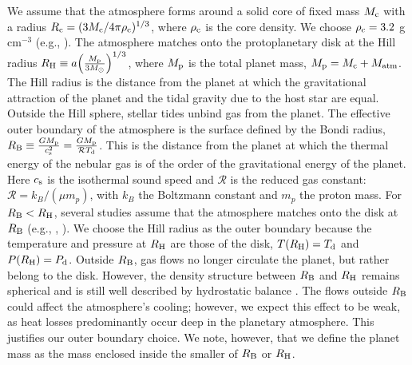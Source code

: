 \documentclass[apj]{emulateapj}
\newcommand{\co}{_{\rm c}}
\newcommand{\di}{_{\rm d}}
\begin{document}
We assume that the atmosphere forms around a solid core of fixed mass $M_{\rm c}$ with a radius $R_{\rm c}=(3 M_{\rm c}/4 \pi \rho_{\rm c})^{1/3}$, where $\rho_{\rm c}$ is the core density. We choose $\rho_{\rm c}=3.2$ g cm$^{-3}$ (e.g., \citealt{pap99}). The atmosphere matches onto the protoplanetary disk at the Hill radius $R_{\rm H} \equiv a \Big(\frac{M_{\rm p}}{3 M_{\odot}}\Big)^{1/3}$, where $M_{\rm p}$ is the total planet mass, $M_{\rm p}=M\co+M_{\rm atm}$. The Hill radius is the distance from the planet at which the gravitational attraction of the planet and the tidal gravity due to the host star are equal. Outside the Hill sphere, stellar tides unbind gas from the planet. The effective outer boundary of the atmosphere is the surface defined by the Bondi radius, $R_{\rm B} \equiv \frac{G M_{\rm p}}{c_{\rm s}^2}=\frac{G M_{\rm p}}{\mathcal{R} T\di}$. This is the distance from the planet at which the thermal energy of the nebular gas is of the order of the gravitational energy of the planet. Here $c_{\rm s}$ is the isothermal sound speed and $\mathcal{R}$ is the reduced gas constant: $\mathcal{R}=k_B/(\mu m_p)$, with $k_B$ the Boltzmann constant and $m_p$ the proton mass. For $R_{\rm B}<R_{\rm H}$, several studies assume that the atmosphere matches onto the disk at $R_{\rm B}$ (e.g., \citealt{ikoma00}, \citealt{pollack96}). We choose the Hill radius as the outer boundary because the temperature and pressure at $R_{\rm H}$ are those of the disk,  $T(R_{\rm H})=T_{\rm d}$ and $P(R_{\rm H})=P_{\rm d}$. Outside $R_{\rm B}$, gas flows no longer circulate the planet, but rather belong to the disk. However, the density structure between $R_{\rm B}$ and $R_{\rm H}$ remains spherical and is still well described by hydrostatic balance \citep{ormel13}. The flows outside $R_{\rm B}$ could affect the atmosphere's cooling; however, we expect this effect to be weak, as heat losses predominantly occur deep in the planetary atmosphere. This justifies our outer boundary choice. We note, however, that we define the planet mass as the mass enclosed inside the smaller of $R_{\rm B}$ or $R_{\rm H}$.


\end{document}

